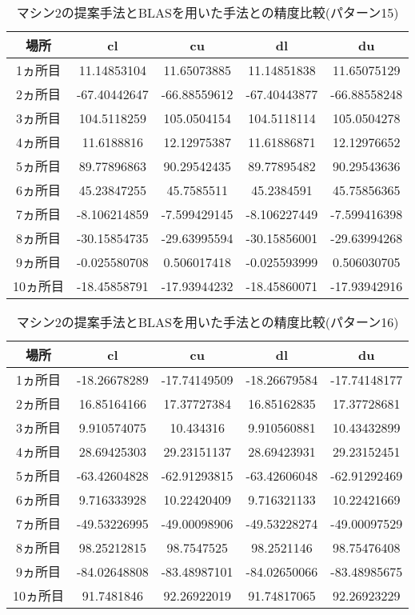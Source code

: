 \documentclass[11pt,a4paper]{jsreport}
\theoremstyle{definition}
\begin{document}
\begin{table}[H]
\centering
\begin{tabular}{|c|c|c|c|c|}
\hline
場所 & cl & cu & dl & du \\ \hline
1ヵ所目 & 11.14853104 & 11.65073885 & 11.14851838 & 11.65075129 \\ \hline
2ヵ所目 & -67.40442647 & -66.88559612 & -67.40443877 & -66.88558248 \\ \hline
3ヵ所目 & 104.5118259 & 105.0504154 & 104.5118114 & 105.0504278 \\ \hline
4ヵ所目 & 11.6188816 & 12.12975387 & 11.61886871 & 12.12976652 \\ \hline
5ヵ所目 & 89.77896863 & 90.29542435 & 89.77895482 & 90.29543636 \\ \hline
6ヵ所目 & 45.23847255 & 45.7585511 & 45.2384591 & 45.75856365 \\ \hline
7ヵ所目 & -8.106214859 & -7.599429145 & -8.106227449 & -7.599416398 \\ \hline
8ヵ所目 & -30.15854735 & -29.63995594 & -30.15856001 & -29.63994268 \\ \hline
9ヵ所目 & -0.025580708 & 0.506017418 & -0.025593999 & 0.506030705 \\ \hline
10ヵ所目 & -18.45858791 & -17.93944232 & -18.45860071 & -17.93942916 \\ \hline
\end{tabular}
\caption{マシン2の提案手法とBLASを用いた手法との精度比較(パターン15)}
\end{table}

\begin{table}[H]
\centering
\begin{tabular}{|c|c|c|c|c|}
\hline
場所 & cl & cu & dl & du \\ \hline
1ヵ所目 & -18.26678289 & -17.74149509 & -18.26679584 & -17.74148177 \\ \hline
2ヵ所目 & 16.85164166 & 17.37727384 & 16.85162835 & 17.37728681 \\ \hline
3ヵ所目 & 9.910574075 & 10.434316 & 9.910560881 & 10.43432899 \\ \hline
4ヵ所目 & 28.69425303 & 29.23151137 & 28.69423931 & 29.23152451 \\ \hline
5ヵ所目 & -63.42604828 & -62.91293815 & -63.42606048 & -62.91292469 \\ \hline
6ヵ所目 & 9.716333928 & 10.22420409 & 9.716321133 & 10.22421669 \\ \hline
7ヵ所目 & -49.53226995 & -49.00098906 & -49.53228274 & -49.00097529 \\ \hline
8ヵ所目 & 98.25212815 & 98.7547525 & 98.2521146 & 98.75476408 \\ \hline
9ヵ所目 & -84.02648808 & -83.48987101 & -84.02650066 & -83.48985675 \\ \hline
10ヵ所目 & 91.7481846 & 92.26922019 & 91.74817065 & 92.26923229 \\ \hline
\end{tabular}
\caption{マシン2の提案手法とBLASを用いた手法との精度比較(パターン16)}
\end{table}
\end{document}
